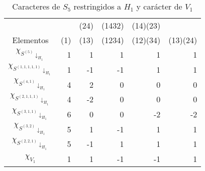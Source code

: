 \documentclass[12pt]{book}
\theoremstyle{definition}
\newcounter{in}
\begin{document}
  \begin{table}[!hbtp]
    \centering
    \begin{small}
      \begin{tabular}{c |r r r r r}
        & & (24) & (1432) & (14)(23) & \\
        Elementos & (1) & (13) & (1234) & (12)(34) & (13)(24) \\
        \hline
        $\chi_{S^{(5)}\downarrow_{H_{1}}}$       & 1 & 1 & 1 & 1 & 1 \\
        $\chi_{S^{(1,1,1,1,1)}\downarrow_{H_{1}}}$ & 1 & -1 & -1 & 1 & 1 \\
        $\chi_{S^{(4,1)}\downarrow_{H_{1}}}$      & 4 & 2 & 0 & 0 & 0 \\
        $\chi_{S^{(2,1,1,1)}\downarrow_{H_{1}}}$   & 4 & -2 & 0 & 0 & 0 \\
        $\chi_{S^{(3,1,1)}\downarrow_{H_{1}}}$     & 6 & 0 & 0 & -2 & -2 \\
        $\chi_{S^{(3,2)}\downarrow_{H_{1}}}$      & 5 & 1 & -1 & 1 & 1 \\
        $\chi_{S^{(2,2,1)}\downarrow_{H_{1}}}$    & 5 & -1 & 1 & 1 & 1 \\
        \hline
        $\chi_{V_{1}}$ & 1 & 1 & -1 & -1 & 1 \\
      \end{tabular}

    \end{small}
    \caption{Caracteres de $S_5$ restringidos a $H_{1}$ y carácter de $V_{1}$}
    \label{tab:restriccion-H_1}
  \end{table}
\end{document}
